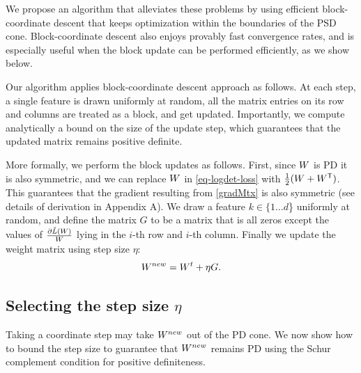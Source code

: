 \documentclass{article}
\begin{document}
We propose an algorithm that alleviates these problems by using efficient block-coordinate descent that keeps optimization within the boundaries of the PSD cone.
Block-coordinate descent also enjoys provably fast convergence rates, and is especially useful when the block update can be performed efficiently, as we show below.

Our algorithm applies block-coordinate descent approach as follows.
At each step, a single feature is drawn uniformly at random, all the matrix entries on its row and columns are treated as a block, and get updated. Importantly, we compute analytically a bound on the size of the update step, which guarantees that the updated matrix remains positive definite.

More formally, we perform the block updates as follows. First, since ${W}$ is PD it is also symmetric, and we can replace ${W}$ in \eqref{eq-logdet-loss} with $\tfrac{1}{2}({W} + {W}{}^\mathsf{T})$. This guarantees that the gradient resulting from \eqref{gradMtx} is also symmetric (see details of derivation in Appendix A). We draw a feature $k \in \{1 \ldots d$\} uniformly at random, and define the matrix $G$ to be a matrix that is all zeros except the values of $\frac{\partial \tilde{L}({W})}{{W}}$ lying in the $i$-th row and $i$-th column. Finally we update the weight matrix using step size $\eta$:
\begin{equation}
    {{W^{new}}} = {W}^t +\eta G.
\label{updateEq}
\end{equation}


\subsection{Selecting the step size $\eta$}\label{subsec:step}
Taking a coordinate step may take ${{W^{new}}}$ out of the PD cone. We now show how to bound the step size to guarantee that ${{W^{new}}}$ remains PD using the Schur complement condition for positive definiteness.
\end{document}
